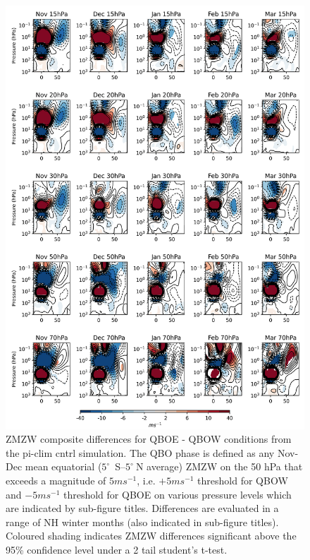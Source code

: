 \newpage
\begin{figure}[h!]
\begin{center}
\noindent\includegraphics[width = 0.82\linewidth]{Figures/Figures-deepQBO/ZMZW_composites_by_month_QBO_phases_U_piclim_MarQBO_vs_Mar_70hPa_5thresh.png}
\caption[ZMZW composites under different QBO phases in the pi-clim cntrl simulation]{ZMZW composite differences for QBOE - QBOW conditions from the pi-clim cntrl simulation. The QBO phase is defined as any Nov-Dec mean equatorial ($5^{\circ}$\ S--$5^{\circ}\ $N average) ZMZW on the 50 hPa that exceeds a magnitude of $5 ms^{-1}$, i.e. $+5 ms^{-1}$ threshold for QBOW and $-5 ms^{-1}$ threshold for QBOE on various pressure levels which are indicated by sub-figure titles. Differences are evaluated in a range of NH winter months (also indicated in sub-figure titles). Coloured shading indicates ZMZW differences significant above the 95\% confidence level under a 2 tail student’s t-test.}
\label{fig:HT_piclim}
\end{center}
\end{figure}
\newpage
